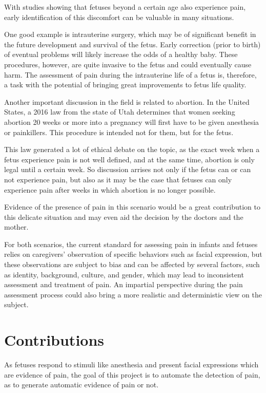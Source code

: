 \documentclass[msc]{ppgccufmg}
\begin{document}
With studies showing that fetuses beyond a certain age also experience pain, early identification of this discomfort can be valuable in many situations.

One good example is intrauterine surgery, which may be of significant benefit in the future development and survival of the fetus. Early correction (prior to birth) of eventual problems will likely increase the odds of a healthy baby. These procedures, however, are quite invasive to the fetus and could eventually cause harm. The assessment of pain during the intrauterine life of a fetus is, therefore, a task with the potential of bringing great improvements to fetus life quality.

Another important discussion in the field is related to abortion. In the United States, a 2016 law from the state of Utah determines that women seeking abortion 20 weeks or more into a pregnancy will first have to be given anesthesia or painkillers. This procedure is intended not for them, but for the fetus.

This law generated a lot of ethical debate on the topic, as the exact week when a fetus experience pain is not well defined, and at the same time, abortion is only legal until a certain week. So discussion arrises not only if the fetus can or can not experience pain, but also as it may be the case that fetuses can only experience pain after weeks in which abortion is no longer possible.

Evidence of the presence of pain in this scenario would be a great contribution to this delicate situation and may even aid the decision by the doctors and the mother.

For both scenarios, the current standard for assessing pain in infants and fetuses relies on caregivers’ observation of specific behaviors such as facial expression, but these observations are subject to bias and can be affected by several factors, such as identity, background, culture, and gender, which may lead to inconsistent assessment and treatment of pain. An impartial perspective during the pain assessment process could also bring a more realistic and deterministic view on the subject.

\section{Contributions}

As fetuses respond to stimuli like anesthesia and present facial expressions which are evidence of pain, the goal of this project is to automate the detection of pain, as to generate automatic evidence of pain or not. 
\end{document}
